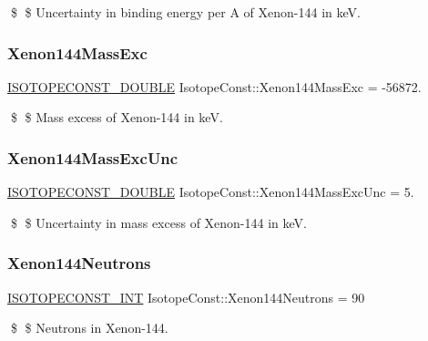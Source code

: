 \$ \$ Uncertainty in binding energy per A of Xenon-\/144 in keV. \mbox{\label{group___isotope_const-_xenon-_xe144_gada4f16595ff7910b027d025801c5f60a}} 
\subsubsection{\texorpdfstring{Xenon144\+Mass\+Exc}{Xenon144MassExc}}
{\footnotesize\ttfamily \mbox{\hyperlink{group___isotope_const-_macros_ga8f45a7272ce02c0b4c65c44636ed719a}{I\+S\+O\+T\+O\+P\+E\+C\+O\+N\+S\+T\+\_\+\+D\+O\+U\+B\+LE}} Isotope\+Const\+::\+Xenon144\+Mass\+Exc = -\/56872.}

\$ \$ Mass excess of Xenon-\/144 in keV. \mbox{\label{group___isotope_const-_xenon-_xe144_ga054359a0e3d5f179b94a5c48fd6b80b9}} 
\subsubsection{\texorpdfstring{Xenon144\+Mass\+Exc\+Unc}{Xenon144MassExcUnc}}
{\footnotesize\ttfamily \mbox{\hyperlink{group___isotope_const-_macros_ga8f45a7272ce02c0b4c65c44636ed719a}{I\+S\+O\+T\+O\+P\+E\+C\+O\+N\+S\+T\+\_\+\+D\+O\+U\+B\+LE}} Isotope\+Const\+::\+Xenon144\+Mass\+Exc\+Unc = 5.}

\$ \$ Uncertainty in mass excess of Xenon-\/144 in keV. \mbox{\label{group___isotope_const-_xenon-_xe144_ga4fa02fe61d5c8ff0f0368108ed01397b}} 
\subsubsection{\texorpdfstring{Xenon144\+Neutrons}{Xenon144Neutrons}}
{\footnotesize\ttfamily \mbox{\hyperlink{group___isotope_const-_macros_ga5f18360b3e99483a35c32d789e62621c}{I\+S\+O\+T\+O\+P\+E\+C\+O\+N\+S\+T\+\_\+\+I\+NT}} Isotope\+Const\+::\+Xenon144\+Neutrons = 90}

\$ \$ Neutrons in Xenon-\/144. \mbox{\label{group___isotope_const-_xenon-_xe144_gae042b3b44486ff54858291e520a905ed}} 

